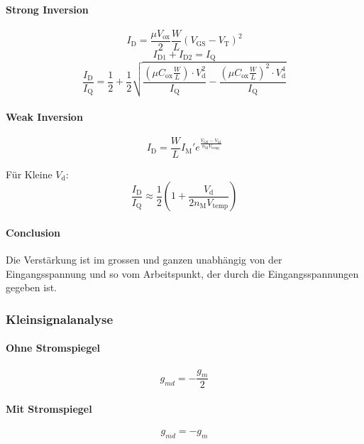 \paragraph{Strong Inversion}
\[
    I_\text{D} = \frac{\mu V_\text{ox}}{2} \frac{W}{L} (V_\text{GS} - V_\text{T})^2
\]
\[
    I_\text{D1} + I_\text{D2} = I_\text{Q}
\]
\[
    \frac{I_\text{D}}{I_\text{Q}} = \frac{1}{2} + \frac{1}{2} \sqrt{\frac{\left(\mu C_\text{ox} \frac{W}{L}\right) \cdot V_\text{d}^2}{I_\text{Q}} - \frac{\left(\mu C_\text{ox} \frac{W}{L}\right)^2 \cdot V_\text{d}^4}{I_\text{Q}}}
\]


\paragraph{Weak Inversion}
\[
    I_\text{D} = \frac{W}{L} I_\text{M}' e^\frac{V_\text{GS}-V_\text{M}}{n_\text{M} V_\text{temp}}
\]


Für Kleine $V_\text{d}$:
\[
    \frac{I_\text{D}}{I_\text{Q}} \approx \frac{1}{2} \left(1+\frac{V_\text{d}}{2 n_\text{M} V_\text{temp}}\right)
\]

\paragraph{Conclusion}
Die Verstärkung ist im grossen und ganzen unabhängig von der Eingangsspannung und so vom Arbeitspunkt, der durch die Eingangsspannungen gegeben ist.

\subsubsection{Kleinsignalanalyse}

\paragraph{Ohne Stromspiegel}
\[
    g_{md} = -\frac{g_m}{2}
\]

\paragraph{Mit Stromspiegel}
\[
    g_{md} = -g_m
\]


